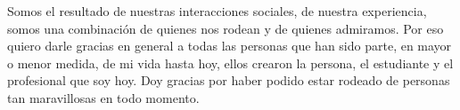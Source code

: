 \begin{acknowledgements}
Somos el resultado de nuestras interacciones sociales, de nuestra experiencia, somos una combinación de quienes nos rodean y de quienes admiramos.
Por eso quiero darle gracias en general a todas las personas que han sido parte, en mayor o menor medida, de mi vida hasta hoy, ellos crearon la persona, el estudiante y el profesional que soy hoy.
Doy gracias por haber podido estar rodeado de personas tan maravillosas en todo momento.

\end{acknowledgements}